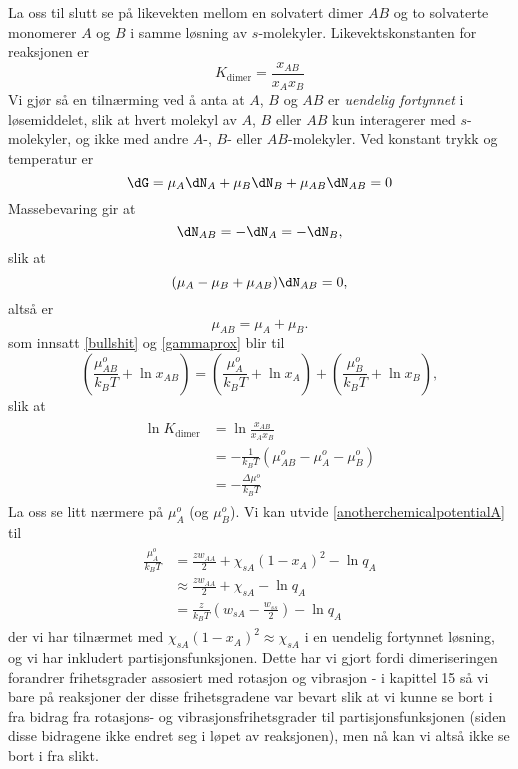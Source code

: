 La oss til slutt se på likevekten mellom en solvatert dimer $AB$ og to solvaterte monomerer $A$ og $B$ i samme løsning av $s$-molekyler. Likevektskonstanten for reaksjonen  er 
\begin{equation}
	K_{\text{dimer}}=\frac{x_{AB}}{x_Ax_B}
\end{equation}
Vi gjør så en tilnærming ved å anta at $A$, $B$ og $AB$ er \emph{uendelig fortynnet} i løsemiddelet, slik at hvert molekyl av $A$, $B$ eller $AB$ kun interagerer med $s$-molekyler, og ikke med andre $A$-, $B$- eller $AB$-molekyler.
Ved konstant trykk og temperatur er
\begin{equation}
	\dG=\mu_A\dN_A+\mu_B\dN_B+\mu_{AB}\dN_{AB}=0
\end{equation}
Massebevaring gir at
\begin{equation}
	\dN_{AB}=-\dN_A=-\dN_B,
\end{equation}
slik at
\begin{equation}
	(\mu_A-\mu_B+\mu_{AB})\dN_{AB}=0,
\end{equation}
altså er 
\begin{equation}
	\mu_{AB}=\mu_A+\mu_B.
\end{equation}
som innsatt \eqref{bullshit} og \eqref{gammaprox} blir til
\begin{equation}
	\left(\frac{\mu_{AB}^o}{k_BT}+\ln x_{AB}\right)=\left(\frac{\mu_{A}^o}{k_BT}+\ln x_{A}\right)+\left(\frac{\mu_{B}^o}{k_BT}+\ln x_{B}\right),
\end{equation}
slik at
\begin{align}
\label{baaaaa}
\begin{split}
	\ln K_{\text{dimer}}&=\ln\frac{x_{AB}}{x_Ax_B} \\
	&=-\frac{1}{k_BT}(\mu_{AB}^o-\mu_A^o-\mu_B^o) \\
	&=-\frac{\Delta \mu^o}{k_BT}
\end{split}
\end{align}
La oss se litt nærmere på $\mu_A^o$ (og $\mu_B^o$). Vi kan utvide \eqref{anotherchemicalpotentialA} til
\begin{align}
\begin{split}
	\frac{\mu_A^o}{k_BT}&=\frac{zw_{AA}}{2}+\chi_{sA}(1-x_A)^2-\ln q_A \\
	&\approx \frac{zw_{AA}}{2}+\chi_{sA}-\ln q_A \\
	&=\frac{z}{k_BT}\left(w_{sA}-\frac{w_{ss}}{2}\right)-\ln q_A
\end{split}
\end{align}
der vi har tilnærmet med $\chi_{sA}(1-x_A)^2\approx\chi_{sA}$ i en uendelig fortynnet løsning, og vi har inkludert partisjonsfunksjonen. Dette har vi gjort fordi dimeriseringen forandrer frihetsgrader assosiert med rotasjon og vibrasjon - i kapittel 15 så vi bare på reaksjoner der disse frihetsgradene var bevart slik at vi kunne se bort i fra bidrag fra rotasjons- og vibrasjonsfrihetsgrader til partisjonsfunksjonen (siden disse bidragene ikke endret seg i løpet av reaksjonen), men nå kan vi altså ikke se bort i fra slikt.


